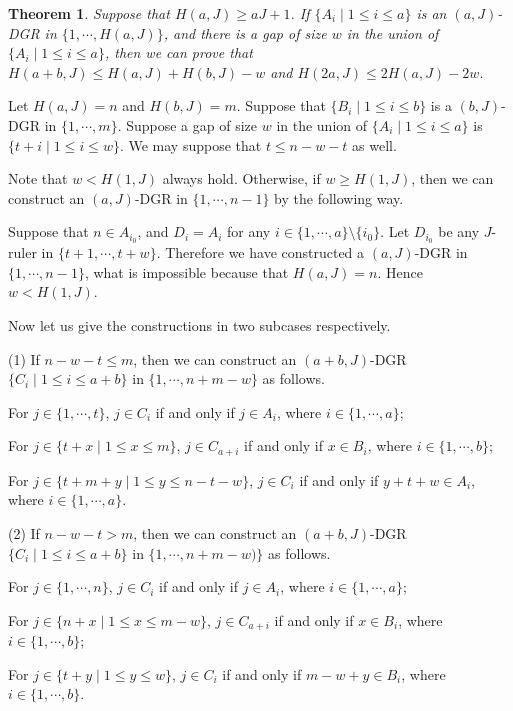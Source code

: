 \documentclass[preprint,12pt]{elsarticle}
\newtheorem{thm}{Theorem}
\begin{document}
\begin{thm} \label{gapw}
Suppose that $H(a,J) \geq aJ+1$. If $\{A_i\; |\; 1 \leq i \leq a \}$ is an $(a, J)$-DGR in $\{1, \cdots, H(a,J)\}$,
and there is a gap of size $w$ in the union of $\{A_i\; | \;1 \leq i \leq a\}$, 
then we can prove that $H(a+b,J) \leq H(a,J) + H(b,J) - w$ and
$H(2a,J) \leq 2H(a,J) - 2w$.
\end{thm}
\begin{pf}
Let $H(a,J) =n$ and $H(b,J) = m$.
Suppose that $\{B_i\; |\; 1 \leq i \leq b \}$ is a $(b, J)$-DGR in $\{1, \cdots, m\}$.
Suppose a gap of size $w$ in the union of $\{A_i\; | \;1 \leq i \leq a\}$ is $\{t+i \;|\; 1 \leq i \leq w\}$. 
We may suppose that $t \leq n-w-t$ as well.

Note that $w < H(1,J)$ always hold. 
Otherwise, if $w \geq H(1,J)$, then we can construct an $(a, J)$-DGR in $\{1, \cdots, n-1 \}$ by the following way.

Suppose that $n \in A_{i_0}$, and $D_i = A_i$ for any $i \in \{1, \cdots, a\} \setminus \{i_0\}$. 
Let $D_{i_0}$ be any $J$-ruler in $\{t+1, \cdots, t+w\}$. Therefore we have constructed a $(a, J)$-DGR in $\{1, \cdots, n-1 \}$, what is impossible because that $H(a,J) =n$. Hence $w < H(1,J)$.


Now let us give the constructions in two subcases respectively.

(1) If $n-w-t \leq m$, then we can construct an $(a+b, J)$-DGR $\{C_i\; |\; 1 \leq i \leq a+b \}$ in $\{1, \cdots, n+m-w \}$ as follows.

For $j \in \{1, \cdots, t\}$, $j \in C_i$ if and only if $j \in A_i$, where $i \in \{1, \cdots, a\}$;

For $j \in \{t+x \; |\; 1 \leq x \leq m \}$, $j \in C_{a+i}$ if and only if $x \in B_i$, where $i \in \{1, \cdots, b\}$;

For $j \in \{t+m+y \; |\; 1 \leq y \leq n-t-w \}$, $j \in C_i$ if and only if $y+t+w \in A_i$, where $i \in \{1, \cdots, a\}$.

(2) If $n-w-t > m$, then we can construct an $(a+b, J)$-DGR $\{C_i\; |\; 1 \leq i \leq a+b \}$ in $\{1, \cdots, n+m-w)\}$ as follows.

For $j \in \{1, \cdots, n\}$, $j \in C_i$ if and only if $j \in A_i$, where $i \in \{1, \cdots, a\}$;

For $j \in \{n+x \; |\; 1 \leq x \leq m-w \}$, $j \in C_{a+i}$ if and only if $x \in B_i$, where $i \in \{1, \cdots, b\}$;

For $j \in \{t+y \; |\; 1 \leq y \leq w \}$, $j \in C_i$ if and only if $m-w+y \in B_i$, where $i \in \{1, \cdots, b\}$.


\end{pf}
\end{document}
